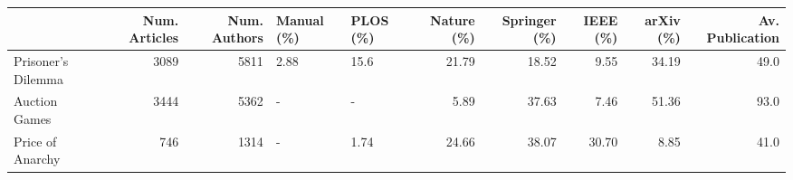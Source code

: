 \begin{tabular}{lrrllrrrrr}
\toprule
{} &  Num. Articles &  Num. Authors & Manual (\%) & PLOS (\%) &  Nature (\%) &  Springer (\%) &  IEEE (\%) &  arXiv (\%) &  Av. Publication \\
\midrule
Prisoner's Dilemma &           3089 &          5811 &       2.88 &     15.6 &       21.79 &         18.52 &      9.55 &      34.19 &             49.0 \\
Auction Games      &           3444 &          5362 &          - &        - &        5.89 &         37.63 &      7.46 &      51.36 &             93.0 \\
Price of Anarchy   &            746 &          1314 &          - &     1.74 &       24.66 &         38.07 &     30.70 &       8.85 &             41.0 \\
\bottomrule
\end{tabular}

